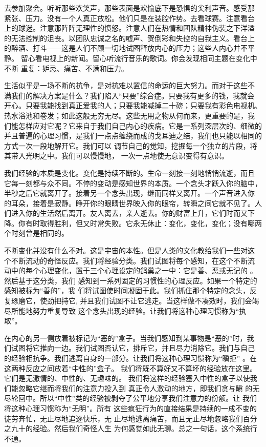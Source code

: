 去参加聚会。听听那些欢笑声，那些表面是欢愉底下是恐惧的尖利声音。感受那
紧\1张、压力。没有一个人真正放松。他们只是在装腔作势。去看球赛。注意看台
上的球迷。注意那阵阵无理性的愤怒。注意人们在热情和团队精神伪装之下洋溢
的无法控制的沮丧。以团队忠诚之名的嘘声、贺倒彩和失控的自我主义。看台上
的醉酒、打斗——这是人们不顾一切地试图释放内心的压力；这些人内心并不平静。
留心看电视上的新闻。留心听流行音乐的歌词。你会发现相同主题在变化中不断
重复：妒忌、痛苦、不满和压力。

生活似乎是一场不断的抗争，是对抗难以置信的命运的巨大努力。而对于这些不
满我们的解决方案是什么？我们陷入“只要”综合症。只要我有更多的钱，我就会
开心。只要我能找到真正爱我的人；只要我能减掉二十磅；只要我有彩色电视机、
热水浴池和卷发；如此这般无穷无尽。这些无用之物从何而来，更重要的是，我
们能怎样应对它呢？它来自于我们自己内心的疾病。它是一系列深层次的、细微的
并且普遍的心理习惯，是我们一点点缠绕而成的戈耳迪之结，我们也只能以相同的方式一次一段地解开它。我们可以
调节自己的觉知，挖掘每一个独立的片段，将其带入光明之中。我们可以慢慢地，
一次一点地使无意识变得有意识。

我们经验的本质是变化。变化是持续不断的。生命一刻接一刻地悄悄流逝，而且
它每一刻都与众不同。不停的变动是感知世界的本质。一个念头才跃入你的脑中，
半秒之后它就离开了。接着另一个念头出现，继而同样又离开。一个声音进入你
的耳朵，接着是寂静。睁开你的眼睛世界映入你的眼帘，转瞬之间它就不见了。人
们进入你的生活然后离开。友人离去，亲人逝去。你的财富上升，它们时而又下
降。你有时取得胜利，\1但又时常失败。它永无休止：变化，变化，变化；没有哪两
个时刻曾是相同的。

不断变化并没有什么不对。这是宇宙的本性。但是人类的文化教给我们一些对这
个不断流动的奇怪反应。我们将经验分类。我们试图将每个感知，在这个不断流
动中的每个心理变化，置于三个心理设定的鸽巢之一中：它是善、恶或无记的%
。然后基于这分类，我们
感知到一系列固定的习惯性的心理反应。如果一个特定的感知被标为“善的”，我
们将试图使时间凝固于此。我们抓住那个特定的念头，反复琢磨它，使劲把持它,
并且我们试图不让它逃走。当这样做不凑效时，我们会竭尽所能地努力重复导致
这个念头出现的经验。让我们将这种心理习惯称为“执取”。

在内心的另一侧放着被标记为“恶的”盒子。当我们感知到某事物是“恶的”时，我
们试图将它推向一边。我们试图否认它，排斥它，并且尽力消除它。我们与自己
的经验相抗争。我们逃离自身的一部分。让我们将这种心理习惯称为“瞋拒”
。在这两种反应之间放着“中性的”盒子。
我们将既不算好又不算坏的经验放在这里。它们是无激情的、中性的、无趣味的。
我们将这样的经验塞入中性的盒子以使我们能忽略它继而将我们的注意力投入到
真正令人激动的地方，即我们贪与瞋%
的无尽轮回中。所以“中性”类的经验被剥夺了公平地分享我们注意力的份额。让
我们将这种心理习惯称为“无明”。所有
这些疯狂行为的直接结果是持续的一成不变的徒劳奔忙，无止尽地追逐快乐，无
止尽地逃离痛苦，而且无止尽地忽略我们百分之九十的经验。然后我们奇怪人生
为何感觉如此无聊。总之一句话，这个系统行不通。


